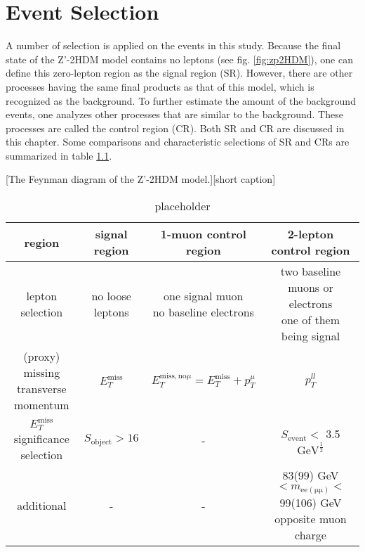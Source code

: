 \documentclass[class=NCU_thesis, crop=false]{standalone}
\begin{document}
\chapter{Event Selection}
A number of selection is applied on the events in this study. Because the final state of the Z'-2HDM model contains no leptons (see fig. \ref{fig:zp2HDM}), one can define this zero-lepton region as the signal region (SR). However, there are other processes having the same final products as that of this model, which is recognized as the background. To further estimate the amount of the background events, one analyzes other processes that are similar to the background. These processes are called the control region (CR). Both SR and CR are discussed in this chapter. Some comparisons and characteristic selections of SR and CRs are summarized in table \ref{tab:SR vs CR}.

[The Feynman diagram of the Z'-2HDM model.][short caption]

\begin{table}[h]
	\caption{placeholder}
	\label{tab:SR vs CR}
	\begin{tabular}{|c|c|c|c|}
		\hline
		region & signal region & 1-muon control region & 2-lepton control region\\
		\hline
		lepton selection & no loose leptons & \shortstack{one signal muon\\no baseline electrons} & \shortstack{two baseline muons or electrons\\one of them being signal}\\
		\hline
		\shortstack{(proxy) missing\\transverse momentum} & $E_T^{\mathrm{miss}}$ & $E_T^{\mathrm{miss, no }\mu} = E_T^{\mathrm{miss}} + p_T^\mu$ & $p_T^{ll}$\\
		\hline
		\shortstack{$E_T^{\mathrm{miss}}$ significance\\selection} & $S_{\mathrm{object}} > 16$ & - & $S_{\mathrm{event}} <$ 3.5 $\mathrm{GeV}^\frac{1}{2}$\\
		\hline
		additional & - & - & \shortstack{83(99) GeV $< m_{\mathrm{ee\left(\mu \mu\right)}} <$ 99(106) GeV\\opposite muon charge}\\
		\hline
	\end{tabular}
\end{table}
\end{document}
